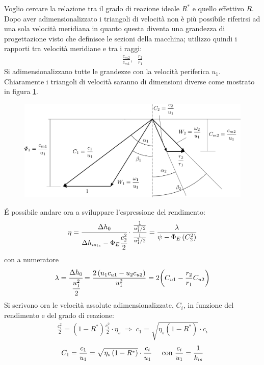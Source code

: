 \vspace{0.5cm}
Voglio cercare la relazione tra il grado di reazione ideale $R^*$ e quello effettivo $R$. Dopo aver adimensionalizzato i triangoli di velocità non è più possibile riferirsi ad una sola velocità meridiana in quanto questa diventa una grandezza di progettazione visto che definisce le sezioni della macchina; utilizzo quindi i rapporti tra velocità meridiane e tra i raggi:
\begin{align*}
\frac{c_{m2}}{c_{m1}}, \;\; \frac{r_2}{r_1}
\end{align*}
Si adimensionalizzano tutte le grandezze con la velocità periferica $u_1$. Chiaramente i triangoli di velocità saranno di dimensioni diverse come mostrato in figura \ref{fig:triangTurb}. 
\begin{figure}[h!]
\centering
  \includegraphics[width=.8\textwidth]{fig/triangTurb.pdf}
\caption{}
\label{fig:triangTurb}
\end{figure}
\'E possibile andare ora a sviluppare l'espressione del rendimento:
\begin{equation}
\eta = \cfrac{\Delta h_0}{\Delta h_{is_{ts}} - \Phi_E \cfrac{c_2^2}{2}} \cdot \frac{\frac{1}{u_1^2/2}}{\frac{1}{u_1^2/2}} = \frac{\lambda}{\psi - \Phi_E \left( C_2^2 \right)}
\end{equation}
con a numeratore
\begin{align*}
\lambda = \cfrac{\Delta h_0}{\cfrac{u_1^2}{2}} = \frac{2 \left( u_1 c_{u1} - u_2 c_{u2} \right)}{u_1^2} = 2 \bigg( C_{u1} - \frac{r_2}{r_1} C_{u2} \bigg)
\end{align*}
Si scrivono ora le velocità assolute adimensionalizzate, $C_i$, in funzione del rendimento e del grado di reazione:
\begin{align*}
\frac{c_1^2}{2} = \left( 1 - R^* \right) \frac{c_i^2}{2} \cdot \eta_s \; \Rightarrow \; c_1 = \sqrt{\eta_s \left( 1 - R^* \right)} \cdot c_i
\end{align*}
\begin{align*}
C_1 = \frac{c_1}{u_1} = \sqrt{\eta_s \left(1- R^* \right)} \cdot \frac{c_i}{u_1} \hspace{0.5cm} \mbox{con } \frac{c_i}{u_1} = \frac{1}{k_{is}}
\end{align*}
